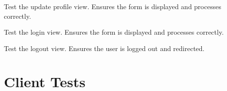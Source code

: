 \documentclass[letterpaper,10pt,english]{sphinxmanual}
\begin{document}
\begin{fulllineitems}
\begin{fulllineitems}
\end{fulllineitems}


\begin{fulllineitems}
\label{\detokenize{modules/tests:account.tests.AccountTests.test_update_profile_view}}
\pysigstartsignatures
{}
\pysigstopsignatures
\sphinxAtStartPar
Test the update profile view. Ensures the form is displayed and processes correctly.

\end{fulllineitems}


\begin{fulllineitems}
\label{\detokenize{modules/tests:account.tests.AccountTests.test_userlogin_view}}
\pysigstartsignatures
{}
\pysigstopsignatures
\sphinxAtStartPar
Test the login view. Ensures the form is displayed and processes correctly.

\end{fulllineitems}


\begin{fulllineitems}
\label{\detokenize{modules/tests:account.tests.AccountTests.test_userlogout_view}}
\pysigstartsignatures
{}
\pysigstopsignatures
\sphinxAtStartPar
Test the logout view. Ensures the user is logged out and redirected.

\end{fulllineitems}


\end{fulllineitems}



\section{Client Tests}
\label{\detokenize{modules/tests:module-client.tests}}\label{\detokenize{modules/tests:client-tests}}
\end{document}
